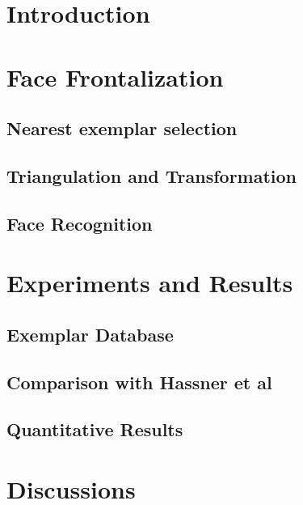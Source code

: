 % 
 
\section{Introduction}


% 

\section{Face Frontalization}


\subsection{Nearest exemplar selection}


\subsection{Triangulation and Transformation}


\subsection{Face Recognition}


\section{Experiments and Results}


\subsection{Exemplar Database}


\subsection{Comparison with Hassner et al}


\subsection{Quantitative Results}


\section{Discussions}

